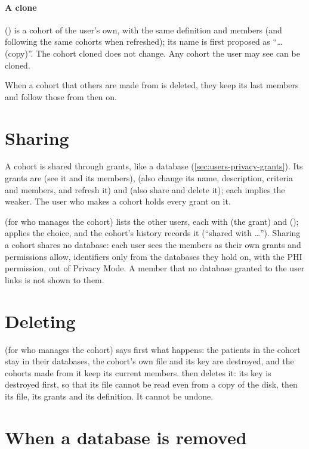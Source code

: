 \paragraph{A clone} () is a cohort of the user's own, with the same definition
and members (and following the same cohorts when refreshed); its name is first proposed as
``\dots{} (copy)''. The cohort cloned does not change. Any cohort the user may see can be
cloned.

When a cohort that others are made from is deleted, they keep its last members and follow
those from then on.

\section{Sharing}
\label{sec:cohorts-share}
\label{sec:cohorts-sharing}

A cohort is shared through grants, like a database (\cref{sec:users-privacy-grants}). Its grants
are  (see it and its members),  (also change its name, description,
criteria and members, and refresh it) and  (also share and delete it); each implies
the weaker. The user who makes a cohort holds every grant on it.

 (for who manages the cohort) lists the other users, each with 
(the  grant) and  ();  applies the choice, and the
cohort's history records it (``shared with \dots''). Sharing a cohort shares no database: each
user sees the members as their own grants and permissions allow, identifiers only from the
databases they hold  on, with the PHI permission, out of Privacy Mode. A member that no
database granted to the user links is not shown to them.

\section{Deleting}
\label{sec:cohorts-delete}

 (for who manages the cohort) says first what happens: the patients in the cohort
stay in their databases, the cohort's own file and its key are destroyed, and the cohorts made
from it keep its current members.  then deletes it: its key is destroyed first, so
that its file cannot be read even from a copy of the disk, then its file, its grants and its
definition. It cannot be undone.

\section{When a database is removed}
\label{sec:cohorts-removal}

